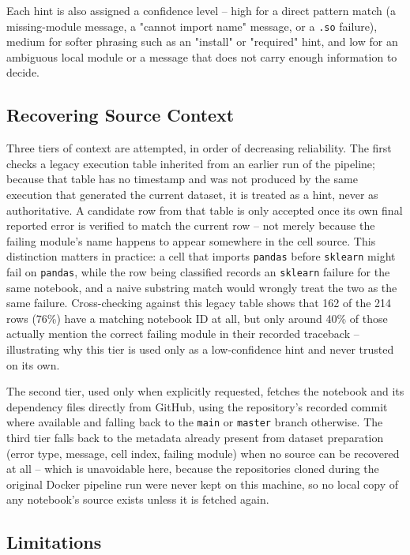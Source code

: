 Each hint is also assigned a confidence level -- high for a direct pattern
match (a missing-module message, a "cannot import name" message, or a
\texttt{.so} failure), medium for softer phrasing such as an "install" or
"required" hint, and low for an ambiguous local module or a message that
does not carry enough information to decide.

\subsection{Recovering Source Context}

Three tiers of context are attempted, in order of decreasing reliability.
The first checks a legacy execution table inherited from an earlier run of
the pipeline; because that table has no timestamp and was not produced by
the same execution that generated the current dataset, it is treated as a
hint, never as authoritative. A candidate row from that table is only
accepted once its own final reported error is verified to match the current
row -- not merely because the failing module's name happens to appear
somewhere in the cell source. This distinction matters in practice: a cell
that imports \texttt{pandas} before \texttt{sklearn} might fail on
\texttt{pandas}, while the row being classified records an \texttt{sklearn}
failure for the same notebook, and a naive substring match would wrongly
treat the two as the same failure. Cross-checking against this legacy table
shows that 162 of the 214 rows (76\%) have a matching notebook ID at all,
but only around 40\% of those actually mention the correct failing module in
their recorded traceback -- illustrating why this tier is used only as a
low-confidence hint and never trusted on its own.

The second tier, used only when explicitly requested, fetches the notebook
and its dependency files directly from GitHub, using the repository's
recorded commit where available and falling back to the \texttt{main} or
\texttt{master} branch otherwise. The third tier falls back to the metadata
already present from dataset preparation (error type, message, cell index,
failing module) when no source can be recovered at all -- which is
unavoidable here, because the repositories cloned during the original Docker
pipeline run were never kept on this machine, so no local copy of any
notebook's source exists unless it is fetched again.

\subsection{Limitations}

